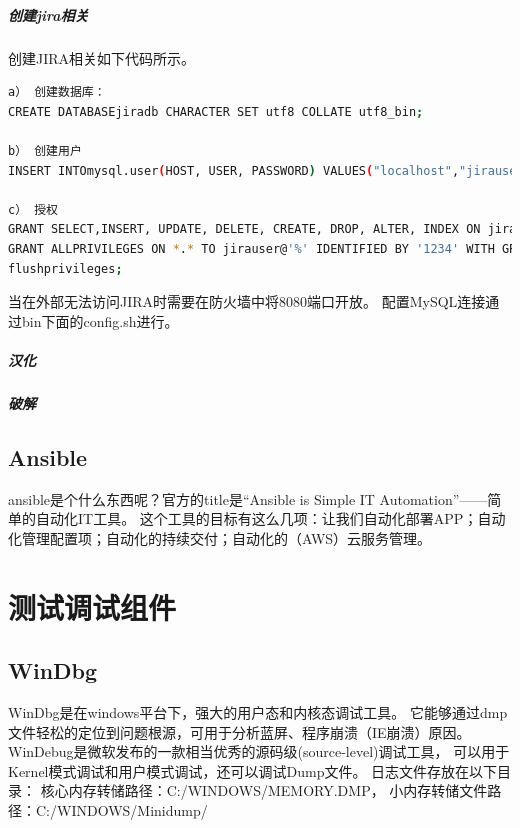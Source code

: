 \documentclass{book}
\begin{document}
\paragraph{创建jira相关}创建JIRA相关如下代码所示。

\begin{lstlisting}[language=Bash]
a） 创建数据库：
CREATE DATABASEjiradb CHARACTER SET utf8 COLLATE utf8_bin;

b） 创建用户
INSERT INTOmysql.user(HOST, USER, PASSWORD) VALUES("localhost","jirauser", PASSWORD("1234"));

c） 授权
GRANT SELECT,INSERT, UPDATE, DELETE, CREATE, DROP, ALTER, INDEX ON jiradb.* TO'jirauser'@'localhost' IDENTIFIED BY '1234';
GRANT ALLPRIVILEGES ON *.* TO jirauser@'%' IDENTIFIED BY '1234' WITH GRANT OPTION;
flushprivileges;
\end{lstlisting}

当在外部无法访问JIRA时需要在防火墙中将8080端口开放。
配置MySQL连接通过bin下面的config.sh进行。


\paragraph{汉化}

\paragraph{破解}

\section{Ansible}

ansible是个什么东西呢？官方的title是“Ansible is Simple IT Automation”——简单的自动化IT工具。
这个工具的目标有这么几项：让我们自动化部署APP；自动化管理配置项；自动化的持续交付；自动化的（AWS）云服务管理。




\chapter{测试调试组件}

\clearpage

\section{WinDbg}

WinDbg是在windows平台下，强大的用户态和内核态调试工具。
它能够通过dmp文件轻松的定位到问题根源，可用于分析蓝屏、程序崩溃（IE崩溃）原因。
WinDebug是微软发布的一款相当优秀的源码级(source-level)调试工具，
可以用于Kernel模式调试和用户模式调试，还可以调试Dump文件。
日志文件存放在以下目录：
核心内存转储路径：C:/WINDOWS/MEMORY.DMP，
小内存转储文件路径：C:/WINDOWS/Minidump/
\end{document}
